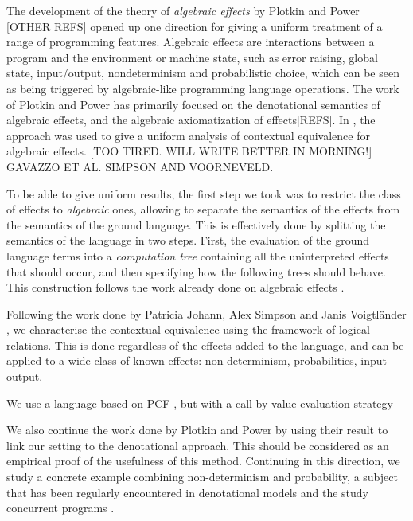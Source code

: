 The development of the theory of \emph{algebraic effects} by Plotkin and Power~\cite{plotkin2001adequacy} [OTHER REFS] opened up one direction for giving a uniform treatment of  a range of programming features.
Algebraic effects are interactions between a  program and the environment or machine state, such as error raising, global state, input/output, nondeterminism and probabilistic choice, which can be seen as being 
triggered by algebraic-like programming language operations. 
The work of Plotkin and Power has primarily focused on the denotational semantics of algebraic effects, and the algebraic axiomatization of effects[REFS]. In \cite{gom}, the approach was used to give a uniform analysis of contextual equivalence for algebraic effects. [TOO TIRED. WILL WRITE BETTER IN MORNING!]
GAVAZZO ET AL. SIMPSON AND VOORNEVELD.


To be able to give uniform results, the first 
step we took was to restrict the class of effects
to \emph{algebraic} ones, 
allowing to separate the semantics 
of the effects from the semantics of the ground language. 
This is effectively done by splitting the semantics of 
the language in two steps. First, the evaluation 
of the ground language terms into a \emph{computation tree}
containing all the uninterpreted effects that should occur, 
and then specifying how the following trees should behave.
This construction follows the work already done on 
algebraic effects \cite{plotkin2001adequacy}.


Following the work done by Patricia
Johann, Alex Simpson and Janis Voigtl\"ander \cite{gom}, we 
characterise the contextual equivalence using the framework 
of logical relations. This is done regardless of the 
effects added to the language, and can be applied to a wide 
class of known effects: non-determinism, probabilities, input-output.

We use a language based on PCF \cite{plotkin1977lcf}, but with  a call-by-value 
evaluation strategy

We also continue the work done by Plotkin and Power \cite{plotkin2001adequacy}
by using their result to link our setting to the denotational approach. This 
should be considered as an empirical proof of the usefulness of this method. 
Continuing in this direction, we study a concrete example combining
non-determinism and probability, a subject that has been regularly encountered 
in denotational models \cite{tix2009semantic} \cite{JGL-mscs16}
\cite{KeimelP2016} and the study concurrent programs
\cite{Mislove2000} \cite{mislove2004axioms}.


